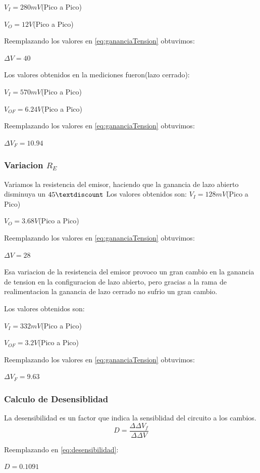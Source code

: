 \documentclass[12pt]{article}
\begin{document}
$V_I=280 mV$(Pico a Pico)

$V_O=12 V$(Pico a Pico)

Reemplazando los valores en  \ref{eq:gananciaTension} obtuvimos: 


$\Delta V=40$

Los valores obtenidos en la mediciones fueron(lazo cerrado):

$V_I=570 mV$(Pico a Pico)

$V_{OF}=6.24 V$(Pico a Pico)

Reemplazando los valores en  \ref{eq:gananciaTension} obtuvimos: 

$\Delta V_F=10.94$

\subsubsection{Variacion $R_E$}
Variamos la resistencia del emisor, haciendo que la ganancia de lazo abierto disminuya un $45\textdiscount$
Los valores obtenidos son:
$V_I=128 mV$(Pico a Pico)

$V_O=3.68 V$(Pico a Pico)

Reemplazando los valores en  \ref{eq:gananciaTension} obtuvimos: 

$\Delta V=28$

Esa variacion de la resistencia del emisor provoco un gran cambio en la ganancia de tension en la configuracion de lazo abierto,
pero gracias a la rama de realimentacion la ganancia de lazo cerrado no sufrio un gran cambio.

Los valores obtenidos son:

$V_I=332 mV$(Pico a Pico)

$V_{OF}=3.2 V$(Pico a Pico)

Reemplazando los valores en  \ref{eq:gananciaTension} obtuvimos: 

$\Delta V_F=9.63$

\subsubsection{Calculo de Desensiblidad}
La desensibilidad es un factor que indica la sensiblidad del circuito a los cambios.
\begin{equation}
\label{eq:desensibilidad}
 D = \frac{\Delta \Delta V_f}{\Delta \Delta V}
\end{equation}

Reemplazando en \ref{eq:desensibilidad}:

$D= 0.1091$
\end{document}
